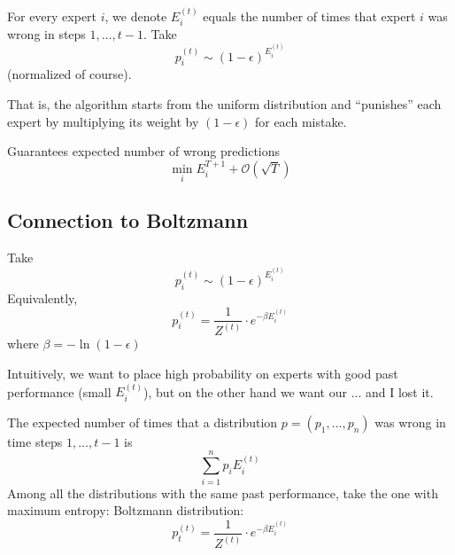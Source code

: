 \documentclass{article}
\begin{document}
For every expert $i$, we denote $E_i^{(t)}$ equals the number of times that expert $i$ was wrong in steps $1,\ldots,t-1$. Take 
\[
p_i^{(t)}\sim \left(1-\epsilon\right)^{E_i^{(t)}}
\]
(normalized of course).

That is, the algorithm starts from the uniform distribution and ``punishes'' each expert by multiplying its weight by $\left(1-\epsilon\right)$ for each mistake.

Guarantees expected number of wrong predictions
\[
\min_i E_i^{T+1} + \mathcal{O}\left(\sqrt{T}\right)
\]

\subsection{Connection to Boltzmann}
Take 
\[
p_i^{(t)}\sim \left(1-\epsilon\right)^{E_i^{(t)}}
\]
Equivalently,
\[
p_i^{(t)} = \frac{1}{Z^(t)}\cdot e^{-\beta E_i^{(t)}}
\]
where $\beta = -\ln(1-\epsilon)$

Intuitively, we want to place high probability on experts with good past performance (small $E_i^{(t)}$), but on the other hand we want our ... and I lost it.

The expected number of times that a distribution $p=\left(p_1,\ldots,p_n\right)$ was wrong in time steps $1,\ldots,t-1$ is 
\[
\sum_{i=1 }^{n }p_i E_i^{(t)}
\]
Among all the distributions with the same past performance, take the one with maximum entropy: Boltzmann distribution:
\[
p_t^{(t)}=\frac{1}{Z^{(t)}} \cdot e^{-\beta E_i^{(t)}}
\]
\end{document}

